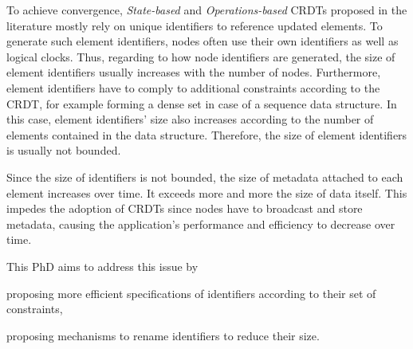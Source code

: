 \documentclass{article}
\begin{document}
To achieve convergence, \emph{State-based} and \emph{Operations-based} \acp{CRDT} proposed in the literature mostly rely on unique identifiers to reference updated elements.
To generate such element identifiers, nodes often use their own identifiers as well as logical clocks.
Thus, regarding to how node identifiers are generated, the size of element identifiers usually increases with the number of nodes.
Furthermore, element identifiers have to comply to additional constraints according to the \ac{CRDT}, for example forming a dense set in case of a sequence data structure\cite{AndreCollaborateCom2013}.
In this case, element identifiers' size also increases according to the number of elements contained in the data structure.
Therefore, the size of element identifiers is usually not bounded.



Since the size of identifiers is not bounded, the size of metadata attached to each element increases over time.
It exceeds more and more the size of data itself.
This impedes the adoption of \acp{CRDT} since nodes have to broadcast and store metadata, causing the application's performance and efficiency to decrease over time.

This PhD aims to address this issue by
\begin{enumerate*}
  \item proposing more efficient specifications of identifiers according to their set of constraints,
  \item proposing mechanisms to rename identifiers to reduce their size.
\end{enumerate*}




\end{document}
